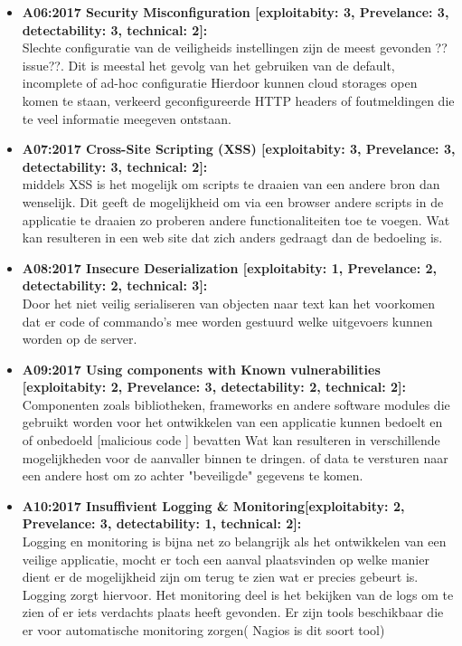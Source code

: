 \begin{itemize}
\item \textbf{A06:2017 Security Misconfiguration [exploitabity: 3, Prevelance: 3, detectability: 3, technical: 2]:}\\
Slechte configuratie van de veiligheids instellingen zijn de meest gevonden ??issue??. Dit is meestal het gevolg van het gebruiken van de default, incomplete of ad-hoc configuratie Hierdoor kunnen cloud storages open komen te staan, verkeerd geconfigureerde HTTP headers of foutmeldingen die te veel informatie meegeven ontstaan.

\item \textbf{A07:2017 Cross-Site Scripting (XSS) [exploitabity: 3, Prevelance: 3, detectability: 3, technical: 2]:}\\ middels XSS is het mogelijk om scripts te draaien van een andere bron dan wenselijk. Dit geeft de mogelijkheid om via een browser andere scripts in de applicatie te draaien zo proberen andere functionaliteiten toe te voegen. Wat kan resulteren in een web site dat zich anders gedraagt dan de bedoeling is.

\item \textbf{A08:2017 Insecure Deserialization [exploitabity: 1, Prevelance: 2, detectability: 2, technical: 3]:}\\ Door het niet veilig serialiseren van objecten naar text kan het voorkomen dat er code of commando's mee worden gestuurd welke uitgevoers kunnen worden op de server.

\item \textbf{A09:2017 Using components with Known vulnerabilities [exploitabity: 2, Prevelance: 3, detectability: 2, technical: 2]:}\\
Componenten zoals bibliotheken, frameworks en andere software modules die gebruikt worden voor het ontwikkelen van een applicatie kunnen bedoelt en of onbedoeld [malicious code ] bevatten Wat kan resulteren in verschillende mogelijkheden voor de aanvaller binnen te dringen. of data te versturen naar een andere host om zo achter "beveiligde" gegevens te komen.

\item \textbf{A10:2017 Insuffivient Logging \& Monitoring[exploitabity: 2, Prevelance: 3, detectability: 1, technical: 2]:}\\
Logging en monitoring is bijna net zo belangrijk als het ontwikkelen van een veilige applicatie, mocht er toch een aanval plaatsvinden op welke manier dient er de mogelijkheid zijn om terug te zien wat er precies gebeurt is. Logging zorgt hiervoor. Het monitoring deel is het bekijken van de logs om te zien of er iets verdachts plaats heeft gevonden. Er zijn tools beschikbaar die er voor automatische monitoring zorgen( Nagios is dit soort tool)

\end{itemize}

